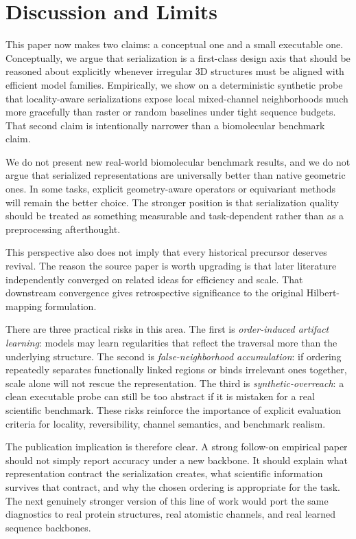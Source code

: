 \section{Discussion and Limits}

This paper now makes two claims: a conceptual one and a small executable one. Conceptually, we argue that serialization is a first-class design axis that should be reasoned about explicitly whenever irregular 3D structures must be aligned with efficient model families. Empirically, we show on a deterministic synthetic probe that locality-aware serializations expose local mixed-channel neighborhoods much more gracefully than raster or random baselines under tight sequence budgets. That second claim is intentionally narrower than a biomolecular benchmark claim.

We do not present new real-world biomolecular benchmark results, and we do not argue that serialized representations are universally better than native geometric ones. In some tasks, explicit geometry-aware operators or equivariant methods will remain the better choice. The stronger position is that serialization quality should be treated as something measurable and task-dependent rather than as a preprocessing afterthought.

This perspective also does not imply that every historical precursor deserves revival. The reason the source paper is worth upgrading is that later literature independently converged on related ideas for efficiency and scale. That downstream convergence gives retrospective significance to the original Hilbert-mapping formulation.

There are three practical risks in this area. The first is \emph{order-induced artifact learning}: models may learn regularities that reflect the traversal more than the underlying structure. The second is \emph{false-neighborhood accumulation}: if ordering repeatedly separates functionally linked regions or binds irrelevant ones together, scale alone will not rescue the representation. The third is \emph{synthetic-overreach}: a clean executable probe can still be too abstract if it is mistaken for a real scientific benchmark. These risks reinforce the importance of explicit evaluation criteria for locality, reversibility, channel semantics, and benchmark realism.

The publication implication is therefore clear. A strong follow-on empirical paper should not simply report accuracy under a new backbone. It should explain what representation contract the serialization creates, what scientific information survives that contract, and why the chosen ordering is appropriate for the task. The next genuinely stronger version of this line of work would port the same diagnostics to real protein structures, real atomistic channels, and real learned sequence backbones.
